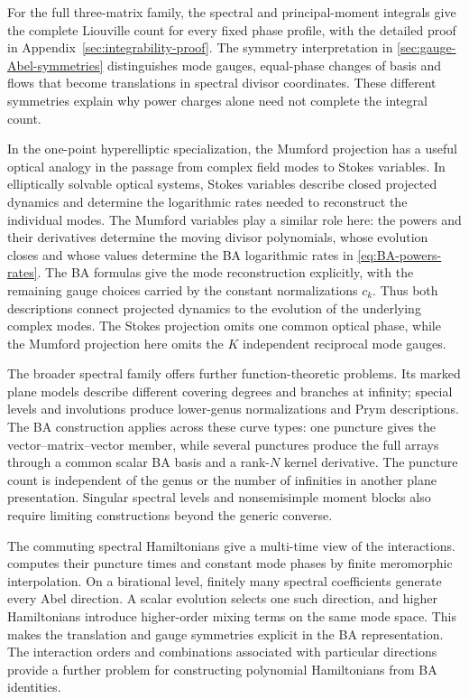 For the full three-matrix family, the spectral and principal-moment
integrals give the complete Liouville count for every fixed phase
profile, with the detailed proof in Appendix~\ref{sec:integrability-proof}. The symmetry interpretation in
\cref{sec:gauge-Abel-symmetries} distinguishes mode gauges, equal-phase
changes of basis and flows that become translations in spectral
divisor coordinates. These different symmetries explain why power
charges alone need not complete the integral count.

In the one-point hyperelliptic specialization, the Mumford projection
has a useful optical analogy in the passage from
complex field modes to Stokes variables. In elliptically solvable optical
systems, Stokes variables describe closed projected dynamics and determine
the logarithmic rates needed to reconstruct the individual modes.
The Mumford variables play a similar role here: the powers and their
derivatives determine the moving divisor polynomials, whose evolution
closes and whose values determine the BA logarithmic rates in
\cref{eq:BA-powers-rates}. The BA formulas give the mode reconstruction
explicitly, with the remaining gauge choices carried by the constant
normalizations $c_k$. Thus both descriptions connect projected dynamics
to the evolution of the underlying complex modes. The Stokes projection
omits one common optical phase, while the Mumford projection here omits
the $K$ independent reciprocal mode gauges.

The broader spectral family offers further function-theoretic problems.
Its marked plane models describe different covering degrees and branches
at infinity; special levels and involutions produce lower-genus
normalizations and Prym descriptions. The BA construction applies across these curve types: one puncture
gives the vector--matrix--vector member, while several punctures
produce the full arrays through a common scalar BA basis and a
rank-$N$ kernel derivative. The puncture count is independent of
the genus or the number of infinities in another plane presentation.
Singular spectral levels and nonsemisimple moment
blocks also require limiting constructions beyond the generic converse.

The commuting spectral Hamiltonians give a multi-time view of the
interactions.  computes their puncture times and constant
mode phases by finite meromorphic interpolation. On a birational
level, finitely many spectral coefficients generate every Abel direction.
A scalar evolution selects one such direction, and higher Hamiltonians
introduce higher-order mixing terms on the same mode space. This makes
the translation and gauge symmetries explicit in the BA representation.
The interaction orders and combinations associated with particular
directions provide a further problem for constructing polynomial
Hamiltonians from BA identities.
